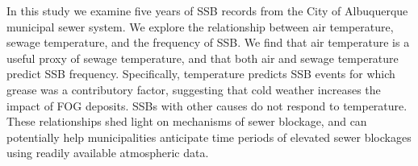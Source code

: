 In this study we examine five years of SSB records from the City of Albuquerque
municipal sewer system.  We explore the relationship between air temperature,
sewage temperature, and the frequency of SSB.  We find that air temperature is
a useful proxy of sewage temperature, and that both air and sewage temperature
predict SSB frequency. Specifically, temperature predicts SSB events for which grease was a contributory factor, suggesting that cold weather increases the impact of FOG deposits. SSBs with other causes do not respond to temperature. These relationships shed light on mechanisms
of sewer blockage, and can potentially help municipalities anticipate time
periods of elevated sewer blockages using readily available atmospheric data.
